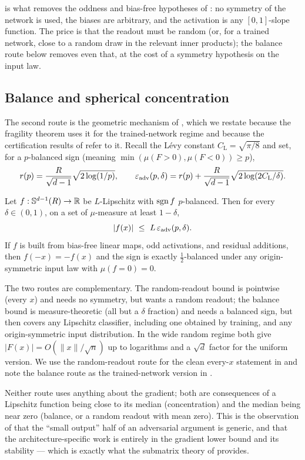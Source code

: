  is what removes the oddness and bias-free hypotheses of \cite{advExt}: no symmetry
of the network is used, the biases are arbitrary, and the activation is any $[0,1]$-slope function.
The price is that the readout must be random (or, for a trained network, close to a random draw in the
relevant inner products); the balance route below removes even that, at the cost of a symmetry
hypothesis on the input law.

\subsection{Balance and spherical concentration}
The second route is the geometric mechanism of \cite{shmaloAdv,advExt}, which we restate because the
fragility theorem uses it for the trained-network regime and because the certification results of
 refer to it. Recall the Lévy constant $C_{\mathrm{L}}=\sqrt{\pi/8}$ and set,
for a $p$-balanced sign (meaning $\min(\mu(F>0),\mu(F<0))\ge p$),
\[
  r(p)=\frac{R}{\sqrt{d-1}}\sqrt{2\log(1/p)},\qquad
  \varepsilon_{\mathrm{adv}}(p,\delta)=r(p)+\frac{R}{\sqrt{d-1}}\sqrt{2\log(2C_{\mathrm{L}}/\delta)}.
\]

\begin{proposition}\label{prop:balance}
Let $f:\mathbb{S}^{d-1}(R)\to\mathbb{R}$ be $L$-Lipschitz with $\operatorname{sgn} f$ $p$-balanced. Then for every $\delta\in(0,1)$,
on a set of $\mu$-measure at least $1-\delta$,
\[
  |f(x)|\ \le\ L\,\eps_{\mathrm{adv}}(p,\delta).
\]
If $f$ is built from bias-free linear maps, odd activations, and residual additions, then $f(-x)=-f(x)$
and the sign is exactly $\tfrac12$-balanced under any origin-symmetric input law with $\mu(f=0)=0$.
\end{proposition}

The two routes are complementary. The random-readout bound is pointwise (every $x$) and needs no
symmetry, but wants a random readout; the balance bound is measure-theoretic (all but a $\delta$
fraction) and needs a balanced sign, but then covers any Lipschitz classifier, including one obtained
by training, and any origin-symmetric input distribution. In the wide random regime both give
$|F(x)|=O(\|x\|/\sqrt{n})$ up to logarithms and a $\sqrt d$ factor for the uniform version. We use the
random-readout route for the clean every-$x$ statement in  and note the balance
route as the trained-network version in .

\begin{remark}\label{rem:easy-half}
Neither route uses anything about the gradient; both are consequences of a Lipschitz function being
close to its median (concentration) and the median being near zero (balance, or a random readout with
mean zero). This is the observation of \cite{advExt} that the ``small output'' half of an adversarial
argument is generic, and that the architecture-specific work is entirely in the gradient lower bound
and its stability --- which is exactly what the submatrix theory of  provides.
\end{remark}
